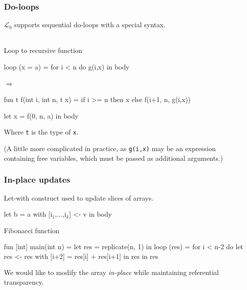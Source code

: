 \documentclass{beamer}
\renewcommand{\emph}[1]{\textcolor{structure}{#1}}
\newcommand{\emp}[1]{\textcolor{DikuRed}{ #1}}
\newcommand{\mymath}[1]{$ #1 $}
\newcommand{\myindx}[1]{_{#1}}
\newcommand{\LO}{$\mathcal{L}_0$}
\begin{document}
\begin{frame}[fragile,t]
  \frametitle{Do-loops}

  \LO{} supports sequential do-loops with a special syntax.\\
  \hfill\\
  \begin{block}{Loop to recursive function}
    \begin{minipage}{0.2\columnwidth}
      \begin{colorcode}
loop (x = a) =
  for i < n do
    \emp{g(i,x)}
in \emph{body}
      \end{colorcode}
    \end{minipage}
    \pause
    \begin{minipage}{0.05\columnwidth}
      $\Rightarrow$
    \end{minipage}
    \begin{minipage}{0.1\columnwidth}
      \begin{colorcode}
fun t f(int i, int n, t x) =
  if i >= n
    then x
    else f(i+1, n, \emp{g(i,x)})

let x = f(0, n, a)
in \emph{body}
      \end{colorcode}
    \end{minipage}
  \end{block}

  Where {\tt t} is the type of {\tt x}.

  (A little more complicated in practice, as {\tt g(i,x)} may be an
  expression containing free variables, which must be passed as
  additional arguments.)

\end{frame}

\begin{frame}[fragile,t]
  \frametitle{In-place updates}

  Let-with construct used to update slices of arrays.

  \begin{colorcode}
    let b = a with [i\mymath{\myindx{1}},...,i\mymath{\myindx{k}}] <- v
    in body
  \end{colorcode}

  \pause

  \begin{block}{Fibonacci function}
    \begin{colorcode}
fun [int] main(int n) =
  let res = replicate(n, 1) in
  loop (res) = for i < n-2 do
    let res <- res with [i+2] = res[i] + res[i+1] in
    res
  in res
    \end{colorcode}
  \end{block}

  We would like to modify the array {\em in-place} while maintaining
  referential transparency.

\end{frame}
\end{document}
